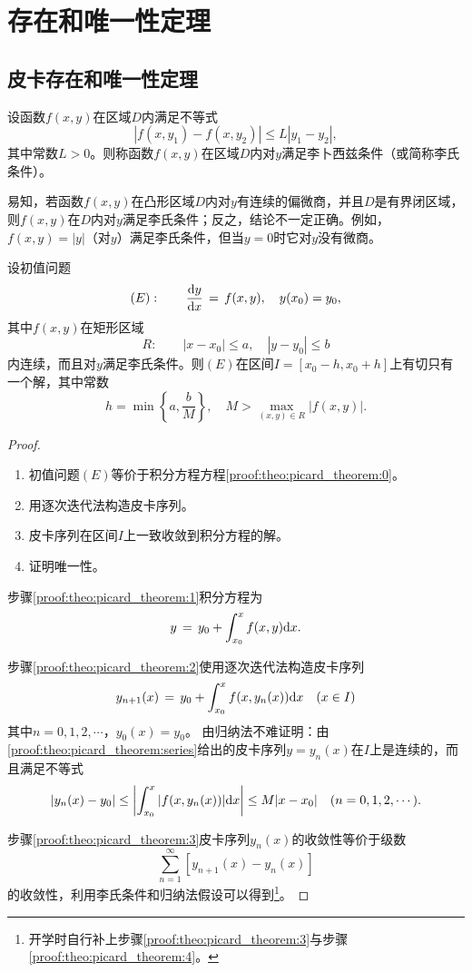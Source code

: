 \section{存在和唯一性定理}
\subsection{皮卡存在和唯一性定理}
\begin{defn}\label{def:Libsitz:like:}
设函数$f(x,y)$在区域$D$内满足不等式
$$\left|f(x,y_1)-f(x,y_2)\right|\leq L\left|y_1-y_2\right|,$$
其中常数$L>0$。则称函数$f(x,y)$在区域$D$内对$y$满足{\heiti 李卜西兹条件}（或简称{\heiti 李氏条件}）。
\end{defn}\par
易知，若函数$f(x,y)$在凸形区域$D$内对$y$有连续的偏微商，并且$D$是有界闭区域，则$f(x,y)$在$D$内对$y$满足李氏条件；反之，结论不一定正确。例如，$f(x,y)=\left|y\right|$（对$y$）满足李氏条件，但当$y=0$时它对$y$没有微商。

\begin{theo}\label{theo:picard_theorem}
设初值问题
$$(E):\quad\quad \frac{\mathrm{d}{}y}{\mathrm{d}{}x}\,=\,f(x,y),\quad y(x_0)=y_0,$$
其中$f(x,y)$在矩形区域
$$R:\quad\quad |x-x_0|\leq a,\quad |y-y_0|\leq b$$
内连续，而且对$y$满足李氏条件。则$(E)$在区间$I=[x_0-h,x_0+h]$上有切只有一个解，其中常数
$$h=\min\left\{a,\frac{b}{M}\right\},\quad M>\max_{(x,y)\in R}|f(x,y)|.$$
\end{theo}
\begin{proof}
\begin{enumerate}[(1)]
\item\label{proof:theo:picard_theorem:1} 初值问题$(E)$等价于积分方程方程\eqref{proof:theo:picard_theorem:0}。
\item\label{proof:theo:picard_theorem:2} 用逐次迭代法构造皮卡序列。
\item\label{proof:theo:picard_theorem:3} 皮卡序列在区间$I$上一致收敛到积分方程的解。
\item\label{proof:theo:picard_theorem:4} 证明唯一性。
\end{enumerate}

步骤\eqref{proof:theo:picard_theorem:1}积分方程为
\begin{equation}\label{proof:theo:picard_theorem:0}
y\,=\,y_0+\int_{x_0}^xf(x,y)\mathrm{d} x.
\end{equation}\par
步骤\eqref{proof:theo:picard_theorem:2}使用逐次迭代法构造皮卡序列
\begin{equation}\label{proof:theo:picard_theorem:series}
y_{n+1}(x)\,=\,y_0+\int_{x_0}^xf(x,y_n(x))\mathrm{d} x\quad (x\in I)
\end{equation}
其中$n=0,1,2,\cdots$，$y_0(x)=y_0$。
由归纳法不难证明：由\eqref{proof:theo:picard_theorem:series}给出的皮卡序列$y=y_n(x)$在$I$上是连续的，而且满足不等式
$$|y_n(x)-y_0|\leq\left|\int_{x_0}^x|f(x,y_n(x))|\mathrm{d} x\right|\leq M|x-x_0|\quad (n=0,1,2,\cdots).$$\par
步骤\eqref{proof:theo:picard_theorem:3}皮卡序列$y_n(x)$的收敛性等价于级数
$$\sum_{n=1}^\infty[y_{n+1}(x)-y_n(x)]$$
的收敛性，利用李氏条件和归纳法假设可以得到\footnote{开学时自行补上步骤\eqref{proof:theo:picard_theorem:3}与步骤\eqref{proof:theo:picard_theorem:4}。}。
\end{proof}

